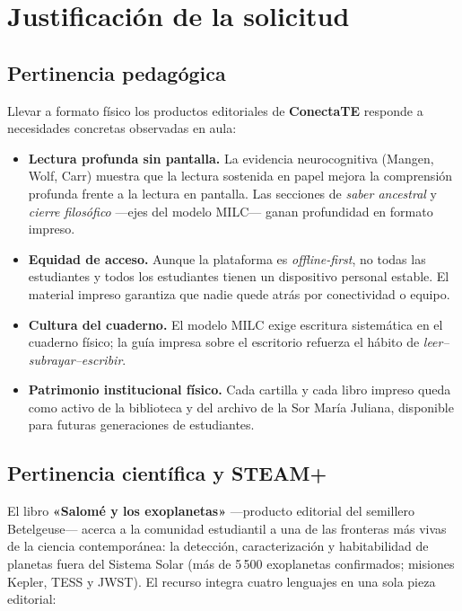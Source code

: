 \documentclass[12pt, letterpaper]{article}
\newcommand{\conectate}{\textbf{ConectaTE}}
\begin{document}
\section{Justificación de la solicitud}

\subsection{Pertinencia pedagógica}

Llevar a formato físico los productos editoriales de \conectate{} responde a necesidades concretas observadas en aula:

\begin{itemize}[leftmargin=*]
  \item \textbf{Lectura profunda sin pantalla.} La evidencia neurocognitiva (Mangen, Wolf, Carr) muestra que la lectura sostenida en papel mejora la comprensión profunda frente a la lectura en pantalla. Las secciones de \textit{saber ancestral} y \textit{cierre filosófico} —ejes del modelo MILC— ganan profundidad en formato impreso.
  \item \textbf{Equidad de acceso.} Aunque la plataforma es \textit{offline-first}, no todas las estudiantes y todos los estudiantes tienen un dispositivo personal estable. El material impreso garantiza que nadie quede atrás por conectividad o equipo.
  \item \textbf{Cultura del cuaderno.} El modelo MILC exige escritura sistemática en el cuaderno físico; la guía impresa sobre el escritorio refuerza el hábito de \textit{leer–subrayar–escribir}.
  \item \textbf{Patrimonio institucional físico.} Cada cartilla y cada libro impreso queda como activo de la biblioteca y del archivo de la Sor María Juliana, disponible para futuras generaciones de estudiantes.
\end{itemize}

\subsection{Pertinencia científica y STEAM+}

El libro \textbf{«Salomé y los exoplanetas»} —producto editorial del semillero Betelgeuse— acerca a la comunidad estudiantil a una de las fronteras más vivas de la ciencia contemporánea: la detección, caracterización y habitabilidad de planetas fuera del Sistema Solar (más de 5\,500 exoplanetas confirmados; misiones Kepler, TESS y JWST). El recurso integra cuatro lenguajes en una sola pieza editorial:
\end{document}
